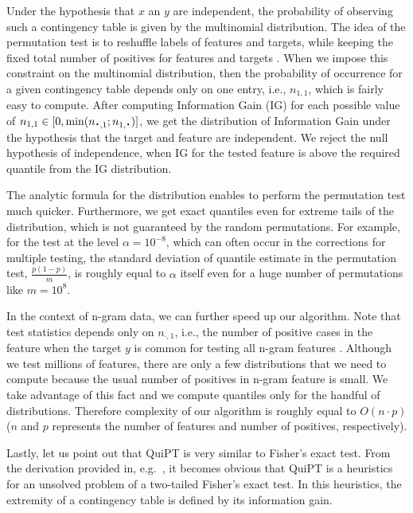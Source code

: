 \documentclass[fleqn,10pt,twoside]{gcb15submission}
\newcommand*{\bigcdot}{\raisebox{-0.25ex}{\scalebox{1.5}{$\cdot$}}}
\begin{document}
  Under the hypothesis that $x$ an $y$ are independent, the probability of 
observing such a contingency table is given by the multinomial distribution. The 
idea of the permutation test is to reshuffle labels of features and targets,  while 
keeping the fixed total number of positives for features and targets . When we 
impose this constraint on the multinomial distribution, then the probability of 
occurrence for a given contingency table depends only on one entry, i.e., 
$n_{1,1}$, which is fairly easy to compute. After computing Information Gain 
(IG) for each possible value of $n_{1,1} \in [0,\min(n_{\bigcdot, 1}; n_{1, 
\bigcdot})]$, we get the distribution of Information Gain under the hypothesis that 
the target and feature are independent. We reject the null hypothesis of independence, when IG for 
%
%
%
%
%
the tested feature is above the required quantile from the IG distribution.

  The analytic formula for the distribution enables to perform the permutation 
test much quicker. Furthermore, we get exact quantiles even for extreme tails of 
the distribution, which is not guaranteed by the random permutations. For 
example, for the test at the level $\alpha=10^{-8}$, which can often occur in the 
corrections for multiple testing, the standard deviation of quantile estimate in 
the permutation test, $\frac{p(1-p)}{m}$, is roughly equal to $\alpha$ itself even 
for a huge number of permutations like $m=10^8$.

  In the context of n-gram data, we can further speed up our algorithm. Note 
that test statistics depends only on $n_{\cdot, 1}$, i.e., the number of 
positive cases in the feature when the target $y$ is common for testing all 
n-gram features . Although we test millions of features, there are only a few 
distributions that we need to compute because the usual number of positives in 
n-gram feature is small. We take advantage of this fact and we compute quantiles 
only for the handful of distributions. Therefore complexity of our algorithm is 
roughly equal to $O(n\cdot p)$ ($n$ and $p$ represents the number of features and 
number of positives, respectively).

  Lastly, let us point out that QuiPT is very similar to Fisher's exact test. 
From the derivation provided in, e.g.~\citep{lehmann_testing_2008}, it becomes 
obvious that QuiPT is a heuristics for an unsolved problem of a two-tailed 
Fisher's exact test. In this heuristics, the extremity of a contingency table is 
defined by its information gain.
\end{document}
